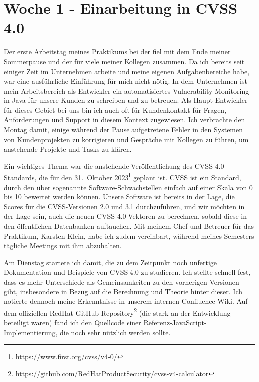 \section{Woche 1 - Einarbeitung in CVSS 4.0} \label{sec:bericht-wo-1}


\lweekdaymarginpar{\weekdayMondayLong}

Der erste Arbeitstag meines Praktikums bei der {\metaeffekt} fiel mit dem Ende meiner Sommerpause und der für viele meiner Kollegen zusammen.
Da ich bereits seit einiger Zeit im Unternehmen arbeite und meine eigenen Aufgabenbereiche habe, war eine ausführliche Einführung für mich nicht nötig.
In dem Unternehmen ist mein Arbeitsbereich als Entwickler ein automatisiertes Vulnerability Monitoring in Java für unsere Kunden zu schreiben und zu betreuen.
Als Haupt-Entwickler für dieses Gebiet bei uns bin ich auch oft für Kundenkontakt für Fragen, Anforderungen und Support in diesem Kontext zugewiesen.
Ich verbrachte den Montag damit, einige während der Pause aufgetretene Fehler in den Systemen von Kundenprojekten zu korrigieren und Gespräche mit Kollegen zu führen, um anstehende Projekte und Tasks zu klären.

Ein wichtiges Thema war die anstehende Veröffentlichung des CVSS 4.0-Standards, die für den 31.\ Oktober 2023\footnote{\url{https://www.first.org/cvss/v4-0/}} geplant ist.
CVSS ist ein Standard, durch den über sogenannte  Software-Schwachstellen einfach auf einer Skala von 0 bis 10 bewertet werden können.
Unsere Software ist bereits in der Lage, die Scores für die CVSS-Versionen 2.0 und 3.1 durchzuführen, und wir möchten in der Lage sein, auch die neuen CVSS 4.0-Vektoren zu berechnen, sobald diese in den öffentlichen Datenbanken auftauchen.
Mit meinem Chef und Betreuer für das Praktikum, Karsten Klein, habe ich zudem vereinbart, während meines Semesters tägliche Meetings mit ihm abzuhalten.

\sweekdaymarginpar{\weekdayTuesdayLong}

Am Dienstag startete ich damit, die zu dem Zeitpunkt noch unfertige Dokumentation und Beispiele von CVSS 4.0 zu studieren.
Ich stellte schnell fest, dass es mehr Unterschiede als Gemeinsamkeiten zu den vorherigen Versionen gibt, insbesondere in Bezug auf die Berechnung und Theorie hinter dieser.
Ich notierte dennoch meine Erkenntnisse in unserem internen Confluence Wiki.
Auf dem offiziellen RedHat GitHub-Repository\footnote{\url{https://github.com/RedHatProductSecurity/cvss-v4-calculator}} (die stark an der Entwicklung beteiligt waren) fand ich den Quellcode einer Referenz-JavaScript-Implementierung, die noch sehr nützlich werden sollte.

